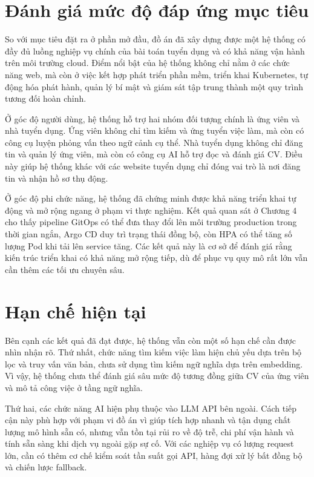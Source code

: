 \documentclass[../DoAn.tex]{subfiles}
\begin{document}
\section{Đánh giá mức độ đáp ứng mục tiêu}

So với mục tiêu đặt ra ở phần mở đầu, đồ án đã xây dựng được một hệ thống có đầy đủ luồng nghiệp vụ chính của bài toán tuyển dụng và có khả năng vận hành trên môi trường cloud. Điểm nổi bật của hệ thống không chỉ nằm ở các chức năng web, mà còn ở việc kết hợp phát triển phần mềm, triển khai Kubernetes, tự động hóa phát hành, quản lý bí mật và giám sát tập trung thành một quy trình tương đối hoàn chỉnh.

Ở góc độ người dùng, hệ thống hỗ trợ hai nhóm đối tượng chính là ứng viên và nhà tuyển dụng. Ứng viên không chỉ tìm kiếm và ứng tuyển việc làm, mà còn có công cụ luyện phỏng vấn theo ngữ cảnh cụ thể. Nhà tuyển dụng không chỉ đăng tin và quản lý ứng viên, mà còn có công cụ AI hỗ trợ đọc và đánh giá CV. Điều này giúp hệ thống khác với các website tuyển dụng chỉ đóng vai trò là nơi đăng tin và nhận hồ sơ thụ động.

Ở góc độ phi chức năng, hệ thống đã chứng minh được khả năng triển khai tự động và mở rộng ngang ở phạm vi thực nghiệm. Kết quả quan sát ở Chương 4 cho thấy pipeline GitOps có thể đưa thay đổi lên môi trường production trong thời gian ngắn, Argo CD duy trì trạng thái đồng bộ, còn HPA có thể tăng số lượng Pod khi tải lên service tăng. Các kết quả này là cơ sở để đánh giá rằng kiến trúc triển khai có khả năng mở rộng tiếp, dù để phục vụ quy mô rất lớn vẫn cần thêm các tối ưu chuyên sâu.

\section{Hạn chế hiện tại}

Bên cạnh các kết quả đã đạt được, hệ thống vẫn còn một số hạn chế cần được nhìn nhận rõ. Thứ nhất, chức năng tìm kiếm việc làm hiện chủ yếu dựa trên bộ lọc và truy vấn văn bản, chưa sử dụng tìm kiếm ngữ nghĩa dựa trên embedding. Vì vậy, hệ thống chưa thể đánh giá sâu mức độ tương đồng giữa CV của ứng viên và mô tả công việc ở tầng ngữ nghĩa.

Thứ hai, các chức năng AI hiện phụ thuộc vào LLM API bên ngoài. Cách tiếp cận này phù hợp với phạm vi đồ án vì giúp tích hợp nhanh và tận dụng chất lượng mô hình sẵn có, nhưng vẫn tồn tại rủi ro về độ trễ, chi phí vận hành và tính sẵn sàng khi dịch vụ ngoài gặp sự cố. Với các nghiệp vụ có lượng request lớn, cần có thêm cơ chế kiểm soát tần suất gọi API, hàng đợi xử lý bất đồng bộ và chiến lược fallback.
\end{document}
